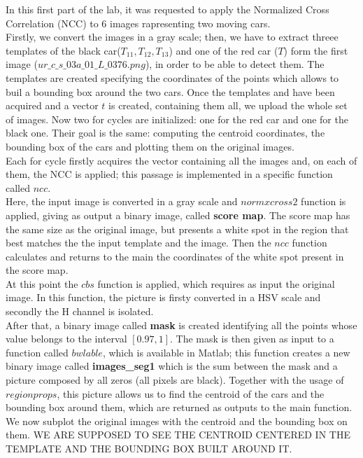 In this first part of the lab, it was requested to apply the Normalized Cross Correlation (NCC) to 6 images rapresenting two moving cars.\\
Firstly, we convert the images in a gray scale; then, we have to extract threee templates of the black car($T_{11}, T_{12}, T_{13}$) and one of the red car ($T$) form 
the first image ($ur\_c\_s\_03a\_01\_L\_0376.png$), in order to be able to detect them.
The templates are created specifying the coordinates of the points which allows to buil a bounding box around the two cars. Once the templates and have been acquired and a vector 
$t$ is created, containing them all, we upload the whole set of images.
Now two for cycles are initialized: one for the red car and one for the black one. Their goal is the same: computing the centroid coordinates, the bounding box of the cars
and plotting them on the original images.\\
Each for cycle firstly acquires the vector containing all the images and, on each of them, the NCC is applied; this passage is implemented in a specific function called $ncc$.\\ 
Here, the input image is converted in a gray scale and $normxcross2$ function is applied, giving as output a binary image, called \textbf{score map}. 
The score map has the same size as the original image, but presents a white spot in the region that best matches the the input template and the image.
Then the $ncc$ function calculates and returns to the main the coordinates of the white spot present in the score map.\\
At this point the $cbs$ function is applied, which requires as input the original image. In this function, the picture is firsty converted in a HSV scale and
secondly the H channel is isolated.\\
After that, a binary image called \textbf{mask} is created identifying all the points whose value belongs to the interval $[0.97, 1]$.
The mask is then given as input to a function called $bwlable$, which is available in Matlab; this function creates a new binary image called \textbf{images\_seg1} which is the sum 
between the mask and a picture composed by all zeros (all pixels are black). Together with the usage of $regionprops$, this picture allows us to find the centroid of the cars 
and the bounding box around them, which are returned as outputs to the main function.\\
We now subplot the original images with the centroid and the bounding box on them. 
WE ARE SUPPOSED TO SEE THE CENTROID CENTERED IN THE TEMPLATE AND THE BOUNDING BOX BUILT AROUND IT.\\

